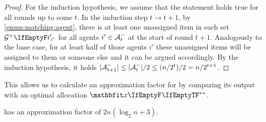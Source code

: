 \begin{proof}
	For the induction hypothesis, we assume that the statement holds true for all rounds up to some \(t\).
	In the induction step \(t \to t+1\), by \cref{enum:matching:agent}, there is at least one unassigned item in each set \(\overlygoodset[i']\) for all agents \(i' \in \mathcal{A}^-_{t}\) at the start of round \(t+1\).
	Analogously to the base case, for at least half of those agents \(i'\) these unassigned items will be assigned to them or someone else and it can be argued accordingly.
	By the induction hypothesis, it holds \(\vert\mathcal{A}^-_{t+1}\vert \leq \vert\mathcal{A}^-_{t}\vert/2 \leq (n/2^t)/2 = n/2^{t+1}\).
\end{proof}

This allows us to calculate an approximation factor for \RepReMatch{} by comparing its output with an optimal allocation \(\alloc*[][]\).
\begin{theorem}
	\label{th:reprematch}
	\RepReMatch{} has an approximation factor of \(2n (\log_2 n + 3)\).
\end{theorem}
